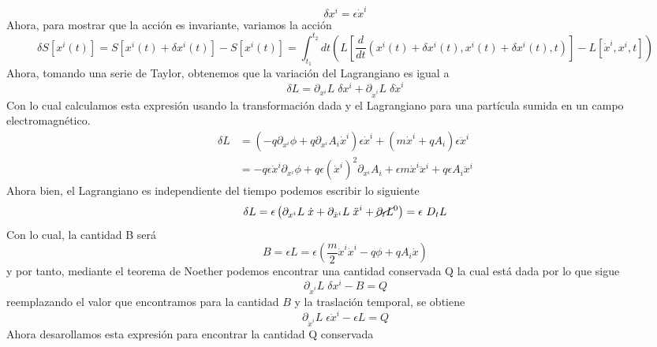 \documentclass[../main.tex]{subfiles}
\begin{document}
\begin{equation}
  \delta x^i = \epsilon \dot{x}^i 
\end{equation}
Ahora, para mostrar que la acción es invariante, variamos la acción
\begin{equation}
  \delta S[x^i(t)] = S[x^i(t) + \delta x^i(t)] - S[x^i(t)] = \int_{t_1}^{t_2} dt \left(L\left[\frac{d}{dt}(x^i(t)+\delta x^i(t), x^i(t)+\delta x^i(t),t)\right] - L[\dot{x}^i, x^i ,t] \right)
\end{equation}
Ahora, tomando una serie de Taylor, obtenemos que la variación del Lagrangiano es igual a
\begin{equation}
  \delta L = \partial_{x^i}L \;\delta x^i + \partial_{\dot{x}^i} L \; \delta \dot{x}^i
\end{equation}
Con lo cual calculamos esta expresión usando la transformación dada y el Lagrangiano para una partícula sumida en un campo electromagnético.
\begin{align*}
  \delta L  & = \left( -q\partial_{x^i}\phi +q\partial_{x^i}A_i \dot{x}^i \right)\epsilon \dot{x}^i + \left( m\dot{x}^i + qA_i \right)\epsilon\ddot{x}^i \\
  & = -q\epsilon \dot{x}^i\partial_{x^i}\phi + q\epsilon (\dot{x}^i)^2\partial_{x^i}A_i + \epsilon m \dot{x}^i \ddot{x}^i + q \epsilon A_i \ddot{x}^i 
\end{align*}
Ahora bien, el Lagrangiano es independiente del tiempo podemos escribir lo siguiente
\begin{equation*}
  \delta L = \epsilon\left(\partial_{x^i}L \; \dot{x}  + \partial_{\dot{x}^i}L \; \ddot{x}^i + \cancel{\partial_t L }^0\right) = \epsilon\ D_t L
\end{equation*}
Con lo cual, la cantidad B será
\begin{equation*}
  B = \epsilon L = \epsilon \left( \frac{m}{2}\dot{x}^i\dot{x}^i - q\phi + qA_i \dot{x} \right)
\end{equation*}
y por tanto, mediante el teorema de Noether podemos encontrar una cantidad conservada Q la cual está dada por lo que sigue
\begin{equation*}
  \partial_{\dot{x}^i}L \; \delta x^i - B = Q 
\end{equation*}
reemplazando el valor que encontramos para la cantidad $B$  y la traslación temporal, se obtiene 
\begin{equation}
  \partial_{\dot{x}^i} L \; \epsilon \dot{x}^i  - \epsilon L = Q
\end{equation}
Ahora desarollamos esta expresión para encontrar la cantidad Q conservada
\end{document}
